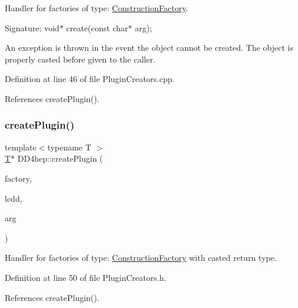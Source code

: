 Handler for factories of type\+: \hyperlink{class_d_d4hep_1_1_construction_factory}{Construction\+Factory}. 

Signature\+: void$\ast$ create(const char$\ast$ arg);

An exception is thrown in the event the object cannot be created. The object is properly casted before given to the caller. 

Definition at line 46 of file Plugin\+Creators.\+cpp.



References create\+Plugin().

\hypertarget{namespace_d_d4hep_ab9015e150f4d7d2bb361649eb8f626d9}{}\label{namespace_d_d4hep_ab9015e150f4d7d2bb361649eb8f626d9} 
\subsubsection{\texorpdfstring{create\+Plugin()}{createPlugin()}\hspace{0.1cm}{\footnotesize\ttfamily [4/6]}}
{\footnotesize\ttfamily template$<$typename T $>$ \\
\hyperlink{class_t}{T}$\ast$ D\+D4hep\+::create\+Plugin (\begin{DoxyParamCaption}\item[{const std\+::string \&}]{factory,  }\item[{\hyperlink{class_d_d4hep_1_1_geometry_1_1_l_c_d_d}{Geometry\+::\+L\+C\+DD} \&}]{lcdd,  }\item[{const std\+::string \&}]{arg }\end{DoxyParamCaption})}



Handler for factories of type\+: \hyperlink{class_d_d4hep_1_1_construction_factory}{Construction\+Factory} with casted return type. 



Definition at line 50 of file Plugin\+Creators.\+h.



References create\+Plugin().

\hypertarget{namespace_d_d4hep_a65c21de63646aa8b39d14ad64e75528e}{}\label{namespace_d_d4hep_a65c21de63646aa8b39d14ad64e75528e} 
